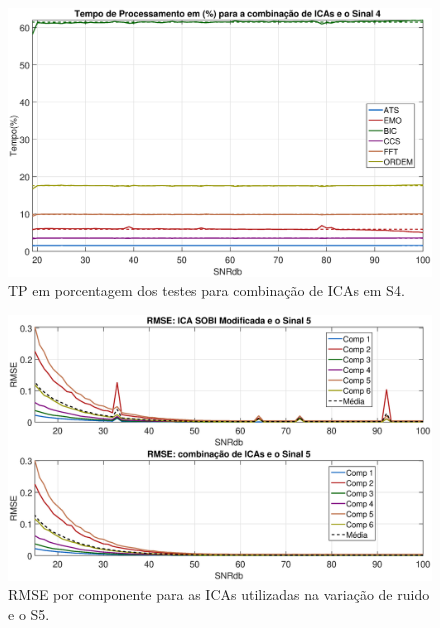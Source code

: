 \documentclass[a4paper,12pt]{monografia}
\theoremstyle{plain}
\theoremstyle{definition}
\theoremstyle{remark}
\begin{document}
\begin{figure}[!htb]
    \begin{center}
    \advance\leftskip -1.5cm
    \includegraphics[scale=0.45]{imagens/ImagensParaOAnexo/TPPRCombinacaoICASinal4.eps}
    \caption{TP em porcentagem dos testes para combinação de ICAs em S4.}
    \label{fig:TPCIRS4}    
    \end{center}
\end{figure}

\begin{figure}[!htb]
    \begin{center}
    \advance\leftskip -1.5cm
    \includegraphics[scale=0.45]{imagens/ImagensParaOAnexo/RMSEcompRTodasICAsSinal5.eps}
    \caption{RMSE por componente para as ICAs utilizadas na variação de ruido e o S5.}
    \label{fig:RMSERS5}    
    \end{center}
\end{figure}
\end{document}
